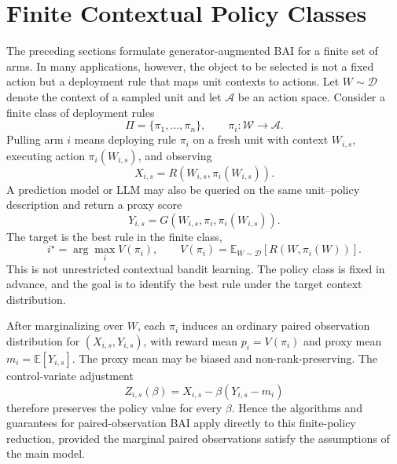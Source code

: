 \section{Finite Contextual Policy Classes}
\label{sec:finite-contextual-policy}

The preceding sections formulate generator-augmented BAI for a finite set of arms. In many applications, however, the object to be selected is not a fixed action but a deployment rule that maps unit contexts to actions. Let \(W\sim\mathcal D\) denote the context of a sampled unit and let \(\mathcal A\) be an action space. Consider a finite class of deployment rules
\[
    \Pi=\{\pi_1,\ldots,\pi_n\},\qquad \pi_i:\mathcal W\to\mathcal A.
\]
Pulling arm \(i\) means deploying rule \(\pi_i\) on a fresh unit with context \(W_{i,s}\), executing action \(\pi_i(W_{i,s})\), and observing
\[
    X_{i,s}=R(W_{i,s},\pi_i(W_{i,s})).
\]
A prediction model or LLM may also be queried on the same unit--policy description and return a proxy score
\[
    Y_{i,s}=G(W_{i,s},\pi_i,\pi_i(W_{i,s})).
\]
The target is the best rule in the finite class,
\[
    i^\star=\arg\max_i V(\pi_i),\qquad
    V(\pi_i)=\mathbb E_{W\sim\mathcal D}[R(W,\pi_i(W))].
\]
This is not unrestricted contextual bandit learning. The policy class is fixed in advance, and the goal is to identify the best rule under the target context distribution.

After marginalizing over \(W\), each \(\pi_i\) induces an ordinary paired observation distribution for \((X_{i,s},Y_{i,s})\), with reward mean \(p_i=V(\pi_i)\) and proxy mean \(m_i=\mathbb E[Y_{i,s}]\). The proxy mean may be biased and non-rank-preserving. The control-variate adjustment
\[
    Z_{i,s}(\beta)=X_{i,s}-\beta(Y_{i,s}-m_i)
\]
therefore preserves the policy value for every \(\beta\). Hence the algorithms and guarantees for paired-observation BAI apply directly to this finite-policy reduction, provided the marginal paired observations satisfy the assumptions of the main model.

